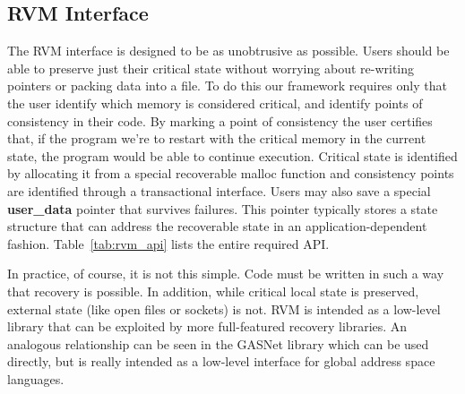 \subsection{RVM Interface}
The RVM interface is designed to be as unobtrusive as possible. Users should be
able to preserve just their critical state without worrying about re-writing
pointers or packing data into a file. To do this our framework requires only
that the user identify which memory is considered critical, and identify points
of consistency in their code. By marking a point of consistency the user
certifies that, if the program we're to restart with the critical memory in the
current state, the program would be able to continue execution. Critical state
is identified by allocating it from a special recoverable malloc function and
consistency points are identified through a transactional interface. Users may
also save a special {\bf user\_data} pointer that survives failures. This pointer
typically stores a state structure that can address the recoverable state in an
application-dependent fashion. Table~\ref{tab:rvm_api} lists the entire required API.

\begin{table}[t!]
\centering
\caption{RVM API}
\label{tab:rvm_api}
\end{table}

In practice, of course, it is not this simple. Code must be written in such a
way that recovery is possible. In addition, while critical local state is
preserved, external state (like open files or sockets) is not. RVM is intended
as a low-level library that can be exploited by more full-featured recovery
libraries. An analogous relationship can be seen in the GASNet \cite{GASNET}
library which can be used directly, but is really intended as a low-level
interface for global address space languages.
